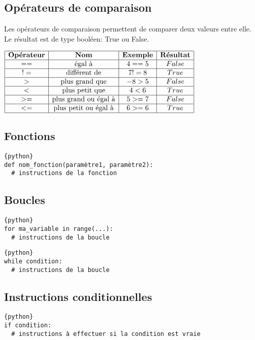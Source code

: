 \documentclass[a4paper,11pt]{article}
\begin{document}
\subsection{Opérateurs de comparaison}
Les opérateurs de comparaison permettent de comparer deux valeurs entre elle. Le résultat est de type booléen: True ou False.\par
\begin{center}
$\begin{array}{|c|c|c|c|}
\hline
\textbf{Opérateur} & \textbf{Nom} & \textbf{Exemple} & \textbf{Résultat} \\
\hline
== & \text{égal à} & 4 == 5 & False\\
\hline
!= & \text{différent de} & 7 != 8 & True\\
\hline
> & \text{plus grand que} &  -8 > 5 & False\\
\hline
< & \text{plus petit que} & 4 < 6 & True\\
\hline
>= & \text{plus grand ou égal à} &  5 >= 7 & False\\
\hline
<= & \text{plus petit ou égal à} & 6 >= 6 & True\\
\hline
\end{array}$
\end{center}

\subsection{Fonctions}
\begin{verbatim}{python}
def nom_fonction(paramètre1, paramètre2):
  # instructions de la fonction
\end{verbatim}

\subsection{Boucles}
\begin{verbatim}{python}
for ma_variable in range(...):
  # instructions de la boucle
\end{verbatim}

\begin{verbatim}{python}
while condition:
  # instructions de la boucle
\end{verbatim}

\subsection{Instructions conditionnelles}
\begin{verbatim}{python}
if condition:
  # instructions à effectuer si la condition est vraie
\end{verbatim}
\end{document}
